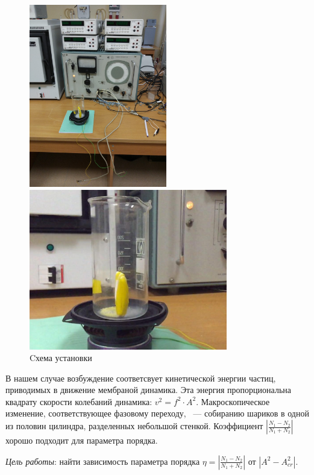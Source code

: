 \documentclass[a4paper, 12pt]{article}
\begin{document}
\begin{figure}[h]
	\begin{center}
		\begin{minipage}{0.45 \linewidth}
			\includegraphics[height=8cm]{img/scheme.jpg}
		\end{minipage}
		\qquad
		\begin{minipage}{0.45 \linewidth}
			\includegraphics[height=7cm]{img/zoom_scheme.jpg}
		\end{minipage}
	\end{center}
	\caption{Cхема установки}
\end{figure}

В нашем случае возбуждение соответсвует кинетической энергии частиц, приводимых в движение мембраной динамика. Эта энергия пропорциональна квадрату скорости колебаний динамика: $v^2 = f^2 \cdot A^2$. Макроскопическое изменение, соответствующее фазовому переходу, ~--- собиранию шариков в одной из половин цилиндра, разделенных небольшой стенкой. Коэффициент  $\left\lvert \frac{N_1 - N_2}{N_1 + N_2} \right\rvert$ хорошо подходит для параметра порядка.

\emph{Цель работы}: найти зависимость параметра порядка $\eta = \left\lvert \frac{N_1 - N_2}{N_1 + N_2} \right\rvert$ от $| A^2 - A_{cr}^2|$.
\end{document}
